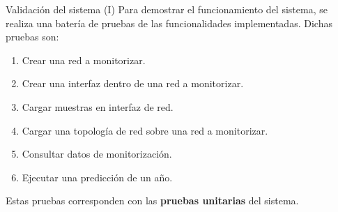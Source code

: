 \documentclass[aspectratio=169,xcolor=dvipsnames]{beamer}
\begin{document}
	\begin{frame}{Validación del sistema (I)}
		Para demostrar el funcionamiento del sistema, se realiza una batería de pruebas de las funcionalidades implementadas. Dichas pruebas son:
		
		\begin{enumerate}
			\item Crear una red a monitorizar.
			
			\item Crear una interfaz dentro de una red a monitorizar.
			
			\item Cargar muestras en interfaz de red.
			
			\item Cargar una topología de red sobre una red a monitorizar.
			
			\item Consultar datos de monitorización.
			
			\item Ejecutar una predicción de un año.
		\end{enumerate}
	
	\vspace{12px}
	
	Estas pruebas corresponden con las \textbf{pruebas unitarias} del sistema.
		
	\end{frame}
\end{document}
